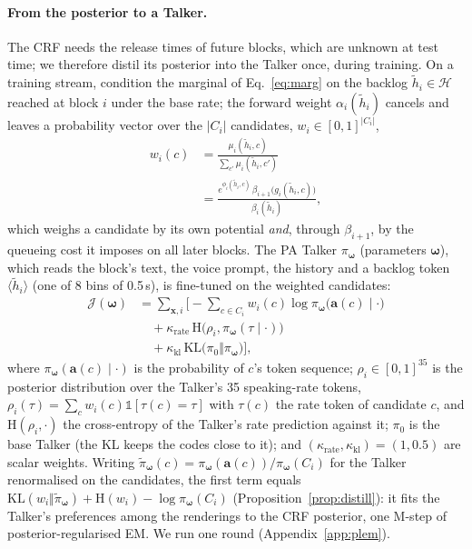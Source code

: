 \paragraph{From the posterior to a Talker.} The CRF needs the release times of future blocks, which are unknown at
test time; we therefore distil its posterior into the Talker once, during training. On a training stream, condition the
marginal of Eq.~\eqref{eq:marg} on the backlog $\tilde{h}_i\in\mathcal{H}$ reached at block $i$ under the base rate; the
forward weight $\alpha_i(\tilde{h}_i)$ cancels and leaves a probability vector over the $|C_i|$ candidates,
$w_i\in[0,1]^{|C_i|}$,
\begin{equation}
\begin{aligned}
w_i(c)&=\frac{\mu_i(\tilde{h}_i,c)}{\sum_{c'}\mu_i(\tilde{h}_i,c')}\\
&=\frac{e^{\phi_i(\tilde{h}_i,c)}\,\beta_{i+1}\big(g_i(\tilde{h}_i,c)\big)}{\beta_i(\tilde{h}_i)},
\end{aligned}
\label{eq:w}
\end{equation}
which weighs a candidate by its own potential \emph{and}, through $\beta_{i+1}$, by the queueing cost it imposes on all
later blocks. The PA Talker $\pi_{\bm{\omega}}$ (parameters $\bm{\omega}$), which reads the block's text, the voice
prompt, the history and a backlog token $\langle\tilde{h}_i\rangle$ (one of 8 bins of 0.5\,s), is fine-tuned on the
weighted candidates:
\begin{equation}
\begin{aligned}
\mathcal{J}(\bm{\omega})&=\textstyle\sum_{\bm{x},i}\Big[-\sum_{c\in C_i}w_i(c)\log\pi_{\bm{\omega}}\big(\bm{a}(c)\mid\cdot\big)\\
&\quad+\kappa_\text{rate}\,\mathrm{H}\big(\rho_i,\pi_{\bm{\omega}}(\tau\mid\cdot)\big)\\
&\quad+\kappa_\text{kl}\,\mathrm{KL}\big(\pi_0\Vert\pi_{\bm{\omega}}\big)\Big],
\end{aligned}
\label{eq:distill}
\end{equation}
where $\pi_{\bm{\omega}}(\bm{a}(c)\mid\cdot)$ is the probability of $c$'s token sequence;
$\rho_i\in[0,1]^{35}$ is the posterior distribution over the Talker's 35 speaking-rate tokens,
$\rho_i(\tau)=\sum_cw_i(c)\mathds{1}[\tau(c)=\tau]$ with $\tau(c)$ the rate token of candidate $c$, and
$\mathrm{H}(\rho_i,\cdot)$ the cross-entropy of the Talker's rate prediction against it; $\pi_0$ is the base Talker (the KL keeps the codes close to
it); and $(\kappa_\text{rate},\kappa_\text{kl})=(1,0.5)$ are scalar weights. Writing
$\tilde{\pi}_{\bm{\omega}}(c)=\pi_{\bm{\omega}}(\bm{a}(c))/\pi_{\bm{\omega}}(C_i)$ for the Talker renormalised on the
candidates, the first term equals $\mathrm{KL}(w_i\Vert\tilde{\pi}_{\bm{\omega}})+\mathrm{H}(w_i)-\log\pi_{\bm{\omega}}(C_i)$
(Proposition~\ref{prop:distill}): it fits the Talker's preferences among the renderings to the CRF posterior, one
M-step of posterior-regularised EM. We run one round (Appendix~\ref{app:plem}).

